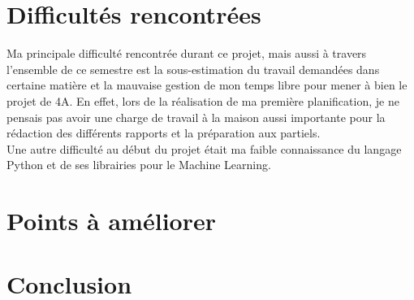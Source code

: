 \chapter{Difficultés rencontrées}
Ma principale difficulté rencontrée durant ce projet, mais aussi à travers l'ensemble de ce semestre est la sous-estimation du travail demandées dans certaine matière et la mauvaise gestion de mon temps libre pour mener à bien le projet de 4A. En effet, lors de la réalisation de ma première planification, je ne pensais pas avoir une charge de travail à la maison aussi importante pour la rédaction des différents rapports et la préparation aux partiels.\\ 

Une autre difficulté au début du projet était ma faible connaissance du langage Python et de ses librairies pour le Machine Learning. 

\chapter{Points à améliorer}


\chapter{Conclusion}